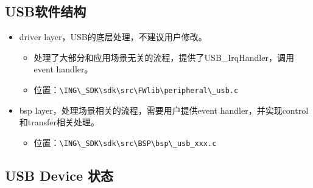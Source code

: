 \documentclass[
  12pt,
]{book}
\providecommand{\tightlist}{%
  \setlength{\itemsep}{0pt}\setlength{\parskip}{0pt}}
\begin{document}
\hypertarget{usbux8f6fux4ef6ux7ed3ux6784}{%
\subsection{USB软件结构}\label{usbux8f6fux4ef6ux7ed3ux6784}}

\begin{itemize}
\tightlist
\item
  driver layer，USB的底层处理，不建议用户修改。

  \begin{itemize}
  \tightlist
  \item
    处理了大部分和应用场景无关的流程，提供了USB\_IrqHandler，调用event handler。
  \item
    位置：\texttt{\textbackslash{}ING\textbackslash{}\_SDK\textbackslash{}sdk\textbackslash{}src\textbackslash{}FWlib\textbackslash{}peripheral\textbackslash{}\_usb.c}
  \end{itemize}
\item
  bsp layer，处理场景相关的流程，需要用户提供event handler，并实现control和transfer相关处理。

  \begin{itemize}
  \tightlist
  \item
    位置：\texttt{\textbackslash{}ING\textbackslash{}\_SDK\textbackslash{}sdk\textbackslash{}src\textbackslash{}BSP\textbackslash{}bsp\textbackslash{}\_usb\_xxx.c}
  \end{itemize}
\end{itemize}

\hypertarget{usb-device-ux72b6ux6001}{%
\subsection{USB Device 状态}\label{usb-device-ux72b6ux6001}}
\end{document}
